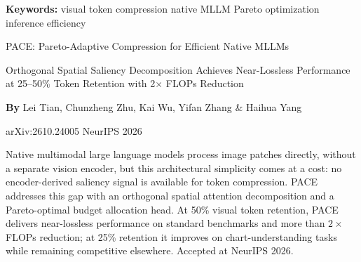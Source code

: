 \documentclass[10pt,twocolumn]{article}
\begin{document}
\setlength{\parindent}{0pt}
\setlength{\parskip}{4pt}

{\small\color{keywordgray}\textbf{Keywords:}
  visual token compression \textbullet{}
  native MLLM \textbullet{}
  Pareto optimization \textbullet{}
  inference efficiency}\par\vspace{4pt}

{\LARGE\bfseries\raggedright
  PACE: Pareto-Adaptive Compression for Efficient Native MLLMs}\par\vspace{4pt}

{\large\itshape\raggedright
  Orthogonal Spatial Saliency Decomposition Achieves Near-Lossless
  Performance at 25--50\% Token Retention with 2$\times$ FLOPs Reduction}\par\vspace{6pt}

{\small\textbf{By} Lei Tian, Chunzheng Zhu, Kai Wu, Yifan Zhang \&
  Haihua Yang}\par\vspace{2pt}

{\small\color{keywordgray}arXiv:2610.24005 \textbullet{}
  NeurIPS 2026}
\par\vspace{2pt}\noindent{\color{rulered}\rule{\columnwidth}{0.6pt}}\vspace{6pt}

Native multimodal large language models process image patches directly,
without a separate vision encoder, but this architectural simplicity comes
at a cost: no encoder-derived saliency signal is available for token
compression. PACE addresses this gap with an orthogonal spatial attention
decomposition and a Pareto-optimal budget allocation head. At 50\% visual
token retention, PACE delivers near-lossless performance on standard benchmarks
and more than $2\times$ FLOPs reduction; at 25\% retention it improves on
chart-understanding tasks while remaining competitive elsewhere. Accepted at
NeurIPS 2026.
\end{document}
